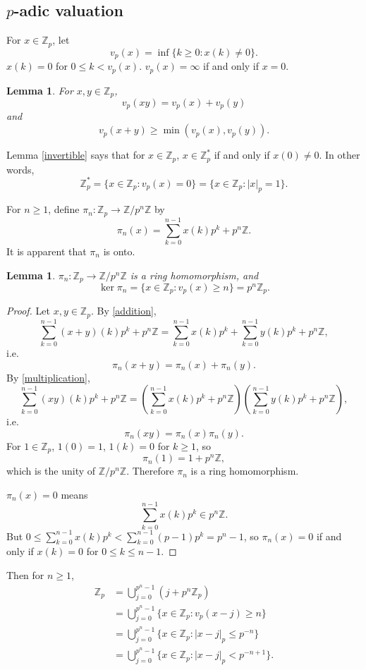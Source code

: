 \documentclass{article}
\newtheorem{lemma}[theorem]{Lemma}
\theoremstyle{definition}
\begin{document}
\subsection{$p$-adic valuation}
For $x \in \mathbb{Z}_p$, let
\[
v_p(x) = \inf\{k \geq 0: x(k) \neq 0\}. 
\]
$x(k)=0$ for $0 \leq k < v_p(x)$. $v_p(x) = \infty$ if and only if $x=0$.

\begin{lemma}
For $x,y \in \mathbb{Z}_p$, 
\[
v_p(xy) = v_p(x)+v_p(y)
\]
and
\[
v_p(x+y) \geq \min(v_p(x),v_p(y)).
\]
\end{lemma}

Lemma \ref{invertible} says that for $x \in \mathbb{Z}_p$, $x \in \mathbb{Z}_p^*$ if and only if $x(0) \neq 0$.
In other words, 
\[
\mathbb{Z}_p^* = \{x \in \mathbb{Z}_p : v_p(x) = 0\} = \{x \in \mathbb{Z}_p : |x|_p = 1\}.
\]

For $n \geq 1$,
define $\pi_n:\mathbb{Z}_p \to \mathbb{Z}/p^n \mathbb{Z}$ by
\[
\pi_n(x) = \sum_{k=0}^{n-1} x(k) p^k + p^n \mathbb{Z}.
\]
It is apparent that $\pi_n$ is onto.

\begin{lemma}
$\pi_n:\mathbb{Z}_p \to \mathbb{Z}/p^n \mathbb{Z}$ is a ring homomorphism,
and
\[
\ker \pi_n = \{x \in \mathbb{Z}_p : v_p(x) \geq n\} = p^n \mathbb{Z}_p.
\]
\end{lemma}
\begin{proof}
Let $x,y \in \mathbb{Z}_p$. By \eqref{addition},
\[
\sum_{k=0}^{n-1} (x+y)(k) p^k + p^n \mathbb{Z} = \sum_{k=0}^{n-1} x(k) p^k + \sum_{k=0}^{n-1} y(k) p^k + p^n \mathbb{Z},
\]
i.e.
\[
\pi_n(x+y) = \pi_n(x)+\pi_n(y).
\]
By \eqref{multiplication},
\[
\sum_{k=0}^{n-1} (xy)(k) p^k + p^n \mathbb{Z} = \left(\sum_{k=0}^{n-1} x(k) p^k + p^n\mathbb{Z} \right)
 \left(\sum_{k=0}^{n-1} y(k) p^k + p^n\mathbb{Z} \right),
\]
i.e.
\[
\pi_n(xy) = \pi_n(x) \pi_n(y).
\]
For $1 \in \mathbb{Z}_p$, $1(0)=1$, $1(k)=0$ for $k \geq 1$, so 
\[
\pi_n(1) = 1 + p^n\mathbb{Z},
\]
which is the unity of $\mathbb{Z}/p^n \mathbb{Z}$. Therefore $\pi_n$ is a ring homomorphism.

$\pi_n(x)=0$ means
\[
\sum_{k=0}^{n-1} x(k) p^k \in p^n \mathbb{Z}.
\]
But $0 \leq \sum_{k=0}^{n-1} x(k) p^k < \sum_{k=0}^{n-1} (p-1) p^k = p^n-1$, so $\pi_n(x)=0$ if and only if 
$x(k)=0$ for $0 \leq k \leq n-1$. 
\end{proof}

Then for $n \geq 1$,
\begin{align*}
\mathbb{Z}_p &= \bigcup_{j=0}^{p^n-1} (j+p^n \mathbb{Z}_p)\\
&=\bigcup_{j=0}^{p^n-1} \{x \in \mathbb{Z}_p: v_p(x-j) \geq n\}\\
&=\bigcup_{j=0}^{p^n-1} \{x \in \mathbb{Z}_p: |x-j|_p \leq p^{-n}\}\\
&=\bigcup_{j=0}^{p^n-1} \{x \in \mathbb{Z}_p: |x-j|_p < p^{-n+1}\}.
\end{align*}
\end{document}
